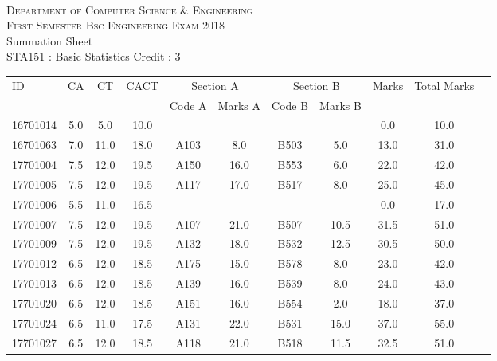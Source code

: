 \documentclass[12pt]{article}
\begin{document}
    \centering
    \begin{minipage}[m]{.8\textwidth} \centering 
	\smallskip
	\\
	\textsc{Department of Computer Science \& Engineering}\\
	\textsc{ First Semester Bsc Engineering Exam 2018}\\
    {\large {\sc Summation Sheet}}\\  
     {\centering STA151 : Basic Statistics     Credit : 3 } \\
    \end{minipage} 
    \begin{center} 
	\renewcommand{\arraystretch}{1.08}
	\begin{small}
    \begin{tabular}{|l|c|c|c|c|c|c|c|c|c|c|} \hline
	\multirow{2}{*}{ID} & 	\multirow{2}{*}{CA}  & 	\multirow{2}{*}{CT}  & 	\multirow{2}{*}{CACT}  & \multicolumn{2 }{c|}{Section A}& \multicolumn{2 }{c|}{Section B} & 	\multirow{2}{*}{Marks}  & 	\multirow{2}{*}{Total Marks}  \\ 
	&  &  &  & Code A & Marks A & Code B & Marks B&  &  \\ \hline
16701014 & 5.0 & 5.0 & 10.0 &  &  &  &  & 0.0 & 10.0\\ \hline 
16701063 & 7.0 & 11.0 & 18.0 & A103 & 8.0 & B503 & 5.0 & 13.0 & 31.0\\ \hline 
17701004 & 7.5 & 12.0 & 19.5 & A150 & 16.0 & B553 & 6.0 & 22.0 & 42.0\\ \hline 
17701005 & 7.5 & 12.0 & 19.5 & A117 & 17.0 & B517 & 8.0 & 25.0 & 45.0\\ \hline 
17701006 & 5.5 & 11.0 & 16.5 &  &  &  &  & 0.0 & 17.0\\ \hline 
17701007 & 7.5 & 12.0 & 19.5 & A107 & 21.0 & B507 & 10.5 & 31.5 & 51.0\\ \hline 
17701009 & 7.5 & 12.0 & 19.5 & A132 & 18.0 & B532 & 12.5 & 30.5 & 50.0\\ \hline 
17701012 & 6.5 & 12.0 & 18.5 & A175 & 15.0 & B578 & 8.0 & 23.0 & 42.0\\ \hline 
17701013 & 6.5 & 12.0 & 18.5 & A139 & 16.0 & B539 & 8.0 & 24.0 & 43.0\\ \hline 
17701020 & 6.5 & 12.0 & 18.5 & A151 & 16.0 & B554 & 2.0 & 18.0 & 37.0\\ \hline 
17701024 & 6.5 & 11.0 & 17.5 & A131 & 22.0 & B531 & 15.0 & 37.0 & 55.0\\ \hline 
17701027 & 6.5 & 12.0 & 18.5 & A118 & 21.0 & B518 & 11.5 & 32.5 & 51.0\\ \hline 

\end{tabular}
\end{small}
\end{center}
\end{document}
